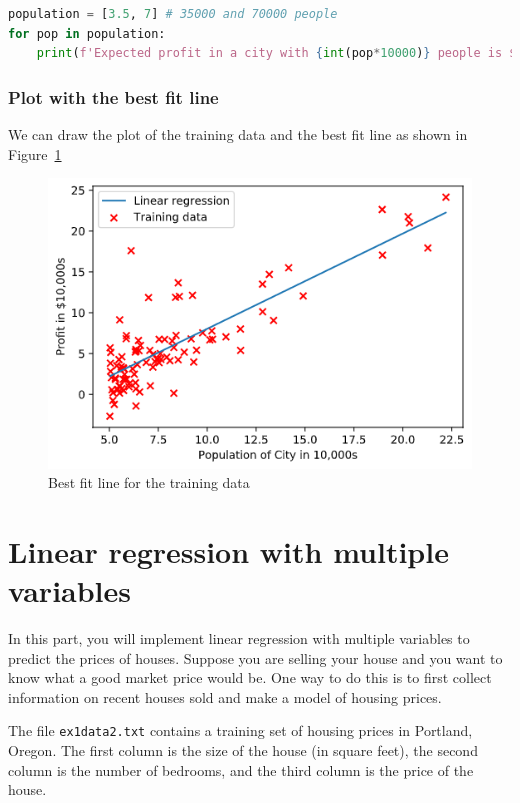 \documentclass[12pt]{article}
\begin{document}
\begin{lstlisting}[language=Python]
population = [3.5, 7] # 35000 and 70000 people
for pop in population:
    print(f'Expected profit in a city with {int(pop*10000)} people is ${int(np.dot([1,pop], theta1)[0]*10000)}')
\end{lstlisting}

\subsubsection{Plot with the best fit line}
We can draw the plot of the training data and the best fit line as shown in Figure~\ref{fig:bestfit}

\begin{figure}[h!]
  \centering
  \includegraphics[scale=0.6]{bestfit.png}
  \caption{Best fit line for the training data}
  \label{fig:bestfit}
\end{figure}

\section{Linear regression with multiple variables}

In this part, you will implement linear regression with multiple variables to predict the prices of houses. Suppose you are selling your house and you want to know what a good market price would be. One way to do this is to first collect information on recent houses sold and make a model of housing prices.

The file \texttt{ex1data2.txt} contains a training set of housing prices in Portland, Oregon. The first column is the size of the house (in square feet), the second column is the number of bedrooms, and the third column is the price of the house.
\end{document}
